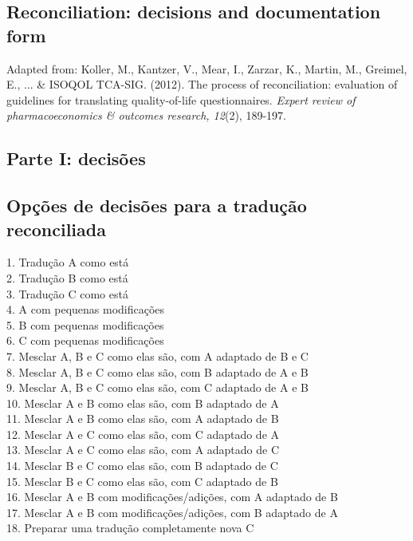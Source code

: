 \documentclass[
  ,doc,11pt, twoside,floatsintext]{apa6}
\begin{document}
\begin{appendix}
\section{Reconciliation: decisions and documentation form}
\label{appendix:form}
Adapted from: Koller, M., Kantzer, V., Mear, I., Zarzar, K., Martin, M., Greimel, E., ... \& ISOQOL TCA-SIG. (2012). The process of reconciliation: evaluation of guidelines for translating quality-of-life questionnaires. \textit{Expert review of pharmacoeconomics \& outcomes research, 12}(2), 189-197.
\begin{flushleft}
\subsection{Parte I: decisões}

\subsection{Opções de decisões para a tradução reconciliada}
1.	Tradução A como está\\
2.	Tradução B como está\\
3.	Tradução C como está\\
4.	A com pequenas modificações\\
5.	B com pequenas modificações\\
6.	C com pequenas modificações\\
7.	Mesclar A, B e C como elas são, com A adaptado de B e C\\
8.	Mesclar A, B e C como elas são, com B adaptado de A e B\\
9.	Mesclar A, B e C como elas são, com C adaptado de A e B\\
10.	Mesclar A e B como elas são, com B adaptado de A\\
11.	Mesclar A e B como elas são, com A adaptado de B\\
12.	Mesclar A e C como elas são, com C adaptado de A\\
13.	Mesclar A e C como elas são, com A adaptado de C\\
14.	Mesclar B e C como elas são, com B adaptado de C\\
15.	Mesclar B e C como elas são, com C adaptado de B\\
16.	Mesclar A e B com modificações/adições, com A adaptado de B\\
17.	Mesclar A e B com modificações/adições, com B adaptado de A\\
18.	Preparar uma tradução completamente nova C\\


\end{flushleft}
\end{appendix}
\end{document}
